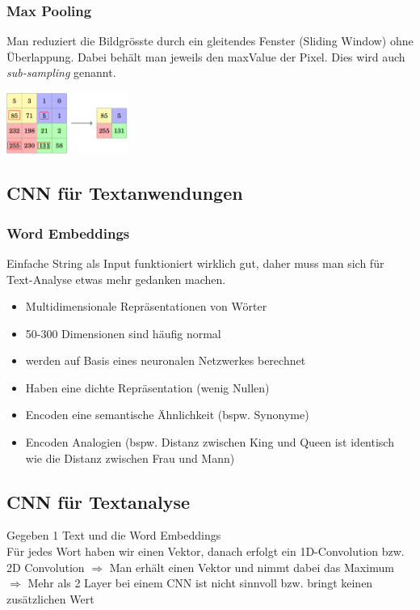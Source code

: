 \documentclass{article}
\newenvironment{Figure}
	{\par\medskip\noindent\minipage{\linewidth}}
	{\endminipage\par\medskip}
\theoremstyle{merke}
\theoremstyle{definition}
\begin{document}
            \subsubsection{Max Pooling}
    Man reduziert die Bildgrösste durch ein gleitendes Fenster (Sliding Window) ohne Überlappung. Dabei behält man jeweils den maxValue der Pixel. Dies wird auch \textit{sub-sampling} genannt.
    \begin{Figure}
    \centering
    \includegraphics[width=150px]{img/CNNMaxPooling.png}
        \label{fig:Abbildung eines CNNs mittels Max Pooling}
    \end{Figure}

        \subsection{CNN für Textanwendungen}
            \subsubsection{Word Embeddings}
            Einfache String als Input funktioniert wirklich gut, daher muss man sich für Text-Analyse etwas mehr gedanken machen. \\
            \begin{itemize}
            \item Multidimensionale Repräsentationen von Wörter
            \item 50-300 Dimensionen sind häufig normal
            \item werden auf Basis eines neuronalen Netzwerkes berechnet
            \item Haben eine dichte Repräsentation (wenig Nullen)
            \item Encoden eine semantische Ähnlichkeit (bspw. Synonyme)
            \item Encoden Analogien (bspw. Distanz zwischen King und Queen ist identisch wie die Distanz zwischen Frau und Mann)
            \end{itemize}

        \subsection{CNN für Textanalyse}
        Gegeben 1 Text und die Word Embeddings\\
        Für jedes Wort haben wir einen Vektor, danach erfolgt ein 1D-Convolution bzw. 2D Convolution $\Rightarrow$ Man erhält einen Vektor und nimmt dabei das Maximum
        $\Rightarrow$ Mehr als 2 Layer bei einem CNN ist nicht sinnvoll bzw. bringt keinen zusätzlichen Wert
\end{document}
